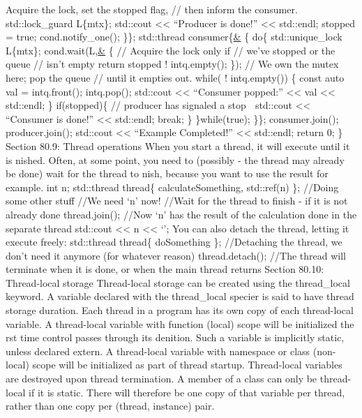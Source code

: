 Acquire the lock, set the stopped flag, // then inform the consumer.
std::lock\_guard L\{mtx\}; std::cout \textless\textless{} ``Producer is
done!'' \textless\textless{} std::endl; stopped = true;
cond.notify\_one(); \}\}; std::thread consumer\{\href{}{\&} \{ do\{
std::unique\_lock L\{mtx\}; cond.wait(L,\href{}{\&} \{ // Acquire the
lock only if // we've stopped or the queue // isn't empty return stopped
\textbar\textbar{} ! intq.empty(); \}); // We own the mutex here; pop
the queue // until it empties out. while( ! intq.empty()) \{ const auto
val = intq.front(); intq.pop(); std::cout \textless\textless{}
``Consumer popped:'' \textless\textless{} val \textless\textless{}
std::endl; \} if(stopped)\{ // producer has signaled a stop  std::cout
\textless\textless{} ``Consumer is done!'' \textless\textless{}
std::endl; break; \} \}while(true); \}\}; consumer.join();
producer.join(); std::cout \textless\textless{} ``Example Completed!''
\textless\textless{} std::endl; return 0; \} Section 80.9: Thread
operations When you start a thread, it will execute until it is nished.
Often, at some point, you need to (possibly - the thread may already be
done) wait for the thread to nish, because you want to use the result
for example. int n; std::thread thread\{ calculateSomething, std::ref(n)
\}; //Doing some other stuff //We need `n' now! //Wait for the thread to
finish - if it is not already done thread.join(); //Now `n' has the
result of the calculation done in the separate thread std::cout
\textless\textless{} n \textless\textless{} `\n'; You can also detach
the thread, letting it execute freely: std::thread thread\{ doSomething
\}; //Detaching the thread, we don't need it anymore (for whatever
reason) thread.detach(); //The thread will terminate when it is done, or
when the main thread returns Section 80.10: Thread-local storage
Thread-local storage can be created using the thread\_local keyword. A
variable declared with the thread\_local specier is said to have thread
storage duration. Each thread in a program has its own copy of each
thread-local variable. A thread-local variable with function (local)
scope will be initialized the rst time control passes through its
denition. Such a variable is implicitly static, unless declared extern.
A thread-local variable with namespace or class (non-local) scope will
be initialized as part of thread startup. Thread-local variables are
destroyed upon thread termination. A member of a class can only be
thread-local if it is static. There will therefore be one copy of that
variable per thread, rather than one copy per (thread, instance) pair.
